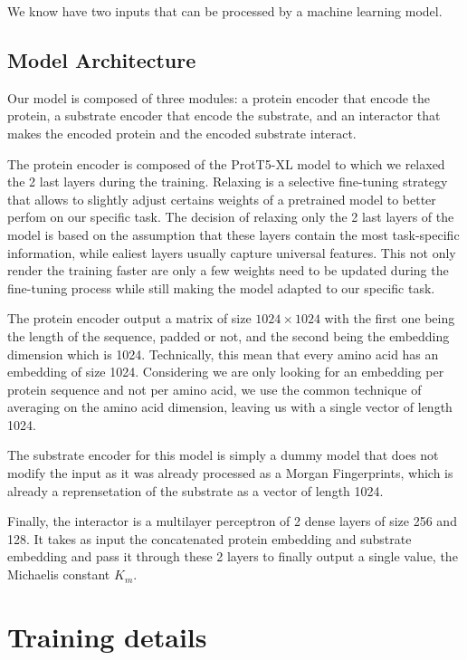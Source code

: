 We know have two inputs that can be processed by a machine learning model.

\subsection{Model Architecture}

Our model is composed of three modules: a protein encoder that encode the protein, a substrate encoder that
encode the substrate, and an interactor that makes the encoded protein and the encoded substrate interact.

The protein encoder is composed of the ProtT5-XL model to which we relaxed the 2 last layers during the training.
Relaxing is a selective fine-tuning strategy that allows to slightly adjust certains weights of a pretrained model 
to better perfom on our specific task. The decision of relaxing only the 2 last layers of the model is based on
the assumption that these layers contain the most task-specific information, while ealiest layers usually capture
universal features. This not only render the training faster are only a few weights need to be updated during the
fine-tuning process while still making the model adapted to our specific task.

The protein encoder output a matrix of size $1024\times 1024$ with the first one being the length of the sequence,
padded or not, and the second being the embedding dimension which is 1024. Technically, this mean that every
amino acid has an embedding of size 1024. Considering we are only looking for an embedding per protein sequence
and not per amino acid, we use the common technique of averaging on the amino acid dimension, leaving us with a
single vector of length 1024.

The substrate encoder for this model is simply a dummy model that does not modify the input as it was already
processed as a Morgan Fingerprints, which is already a reprensetation of the substrate as a vector of length 1024.

Finally, the interactor is a multilayer perceptron of 2 dense layers of size 256 and 128. It takes as input the
concatenated protein embedding and substrate embedding and pass it through these 2 layers to finally output a single
value, the Michaelis constant $K_m$.

\section{Training details}

